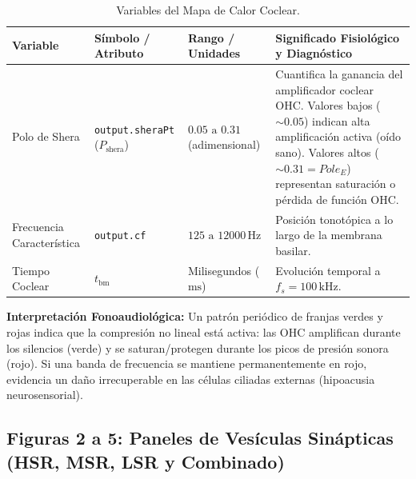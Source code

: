 \documentclass[12pt,a4paper]{article}
\begin{document}
\begin{table}[H]
\centering
\caption{Variables del Mapa de Calor Coclear.}
\begin{tabularx}{\textwidth}{>{\raggedright\arraybackslash}p{3.0cm} >{\raggedright\arraybackslash}p{3.4cm} >{\raggedright\arraybackslash}p{2.8cm} X}
\toprule
\textbf{Variable} & \textbf{Símbolo / Atributo} & \textbf{Rango / Unidades} & \textbf{Significado Fisiológico y Diagnóstico} \\
\midrule
Polo de Shera & \texttt{output.sheraPt} ($P_{\text{shera}}$) & $0.05 \text{ a } 0.31$ (adimensional) & Cuantifica la ganancia del amplificador coclear OHC. Valores bajos ($\sim 0.05$) indican alta amplificación activa (oído sano). Valores altos ($\sim 0.31 = Pole_E$) representan saturación o pérdida de función OHC. \\
Frecuencia Característica & \texttt{output.cf} & $125 \text{ a } 12000\,\text{Hz}$ & Posición tonotópica a lo largo de la membrana basilar. \\
Tiempo Coclear & $t_{\text{bm}}$ & Milisegundos ($\text{ms}$) & Evolución temporal a $f_s = 100\,\text{kHz}$. \\
\bottomrule
\end{tabularx}
\end{table}

\textbf{Interpretación Fonoaudiológica:} Un patrón periódico de franjas verdes y rojas indica que la compresión no lineal está activa: las OHC amplifican durante los silencios (verde) y se saturan/protegen durante los picos de presión sonora (rojo). Si una banda de frecuencia se mantiene permanentemente en rojo, evidencia un daño irrecuperable en las células ciliadas externas (hipoacusia neurosensorial).

\subsection{Figuras 2 a 5: Paneles de Vesículas Sinápticas (HSR, MSR, LSR y Combinado)}
\end{document}
